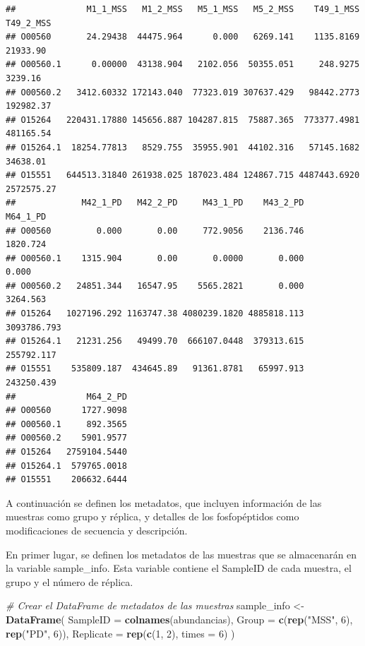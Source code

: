 \documentclass[
]{article}
\newenvironment{Shaded}{\begin{snugshade}}{\end{snugshade}}
\newcommand{\AttributeTok}[1]{\textcolor[rgb]{0.13,0.29,0.53}{#1}}
\newcommand{\CommentTok}[1]{\textcolor[rgb]{0.56,0.35,0.01}{\textit{#1}}}
\newcommand{\DecValTok}[1]{\textcolor[rgb]{0.00,0.00,0.81}{#1}}
\newcommand{\FunctionTok}[1]{\textcolor[rgb]{0.13,0.29,0.53}{\textbf{#1}}}
\newcommand{\NormalTok}[1]{#1}
\newcommand{\OtherTok}[1]{\textcolor[rgb]{0.56,0.35,0.01}{#1}}
\newcommand{\StringTok}[1]{\textcolor[rgb]{0.31,0.60,0.02}{#1}}
\begin{document}
\begin{verbatim}
##              M1_1_MSS   M1_2_MSS   M5_1_MSS   M5_2_MSS    T49_1_MSS  T49_2_MSS
## O00560       24.29438  44475.964      0.000   6269.141    1135.8169   21933.90
## O00560.1      0.00000  43138.904   2102.056  50355.051     248.9275    3239.16
## O00560.2   3412.60332 172143.040  77323.019 307637.429   98442.2773  192982.37
## O15264   220431.17880 145656.887 104287.815  75887.365  773377.4981  481165.54
## O15264.1  18254.77813   8529.755  35955.901  44102.316   57145.1682   34638.01
## O15551   644513.31840 261938.025 187023.484 124867.715 4487443.6920 2572575.27
##             M42_1_PD   M42_2_PD     M43_1_PD    M43_2_PD    M64_1_PD
## O00560         0.000       0.00     772.9056    2136.746    1820.724
## O00560.1    1315.904       0.00       0.0000       0.000       0.000
## O00560.2   24851.344   16547.95    5565.2821       0.000    3264.563
## O15264   1027196.292 1163747.38 4080239.1820 4885818.113 3093786.793
## O15264.1   21231.256   49499.70  666107.0448  379313.615  255792.117
## O15551    535809.187  434645.89   91361.8781   65997.913  243250.439
##              M64_2_PD
## O00560      1727.9098
## O00560.1     892.3565
## O00560.2    5901.9577
## O15264   2759104.5440
## O15264.1  579765.0018
## O15551    206632.6444
\end{verbatim}

A continuación se definen los metadatos, que incluyen información de las
muestras como grupo y réplica, y detalles de los fosfopéptidos como
modificaciones de secuencia y descripción.

En primer lugar, se definen los metadatos de las muestras que se
almacenarán en la variable sample\_info. Esta variable contiene el
SampleID de cada muestra, el grupo y el número de réplica.

\begin{Shaded}
\begin{Highlighting}[]
\CommentTok{\# Crear el DataFrame de metadatos de las muestras}
\NormalTok{sample\_info }\OtherTok{\textless{}{-}} \FunctionTok{DataFrame}\NormalTok{(}
    \AttributeTok{SampleID =} \FunctionTok{colnames}\NormalTok{(abundancias),}
    \AttributeTok{Group =} \FunctionTok{c}\NormalTok{(}\FunctionTok{rep}\NormalTok{(}\StringTok{"MSS"}\NormalTok{, }\DecValTok{6}\NormalTok{), }\FunctionTok{rep}\NormalTok{(}\StringTok{"PD"}\NormalTok{, }\DecValTok{6}\NormalTok{)),}
    \AttributeTok{Replicate =} \FunctionTok{rep}\NormalTok{(}\FunctionTok{c}\NormalTok{(}\DecValTok{1}\NormalTok{, }\DecValTok{2}\NormalTok{), }\AttributeTok{times =} \DecValTok{6}\NormalTok{)}
\NormalTok{)}
\end{Highlighting}
\end{Shaded}
\end{document}
